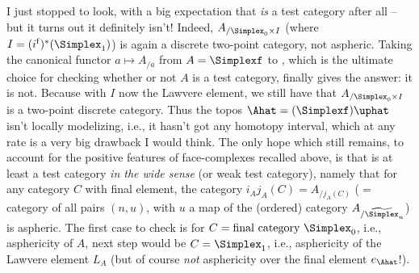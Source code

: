 I just stopped to look, with a big expectation that \Simplexf{}
\emph{is} a test category after all -- but it turns out it definitely
isn't! Indeed, $A_{/\Simplex_0\times I}$ (where
$I=(i^{\mathrm f})^*(\Simplex_1)$) is again a discrete two-point
category, not aspheric. Taking the canonical functor $a\mapsto A_{/a}$
from $A=\Simplexf$ to \Cat, which is the ultimate choice for checking
whether or not $A$ is a test category, finally gives the answer: it is
not. Because with $I$ now the Lawvere element, we still have that
$A_{/\Simplex_0\times I}$ is a two-point discrete category. Thus the
topos $\Ahat=(\Simplexf)\uphat$ isn't locally modelizing, i.e., it
hasn't got any homotopy interval, which at any rate is a very big
drawback I would think. The only hope which still remains, to account
for the positive features of face-complexes recalled above, is that
\Simplexf{} is at least a test category \emph{in the wide sense} (or weak test category), namely
that for any category $C$ with final element, the category
$i_Aj_A(C) = A_{/j_A(C)}$ ($=$ category of all pairs $(n,u)$, with $u$
a map of the (ordered) category $A_{/\widetilde\Simplex_n}$) is
aspheric. The first case to check is for
$C=\text{final category $\Simplex_0$}$, i.e., asphericity of $A$, next
step would be $C=\Simplex_1$, i.e., asphericity of the Lawvere element
$L_A$ (but of course \emph{not} asphericity over the final element
$e_\Ahat$!).

